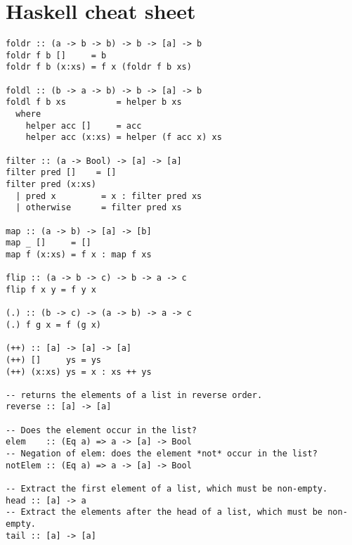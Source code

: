 \documentclass[paper=letter, fontsize=13pt]{article} %
\numberwithin{equation}{section} %
\begin{document}
\section{Haskell cheat sheet}
\begin{lstlisting}
foldr :: (a -> b -> b) -> b -> [a] -> b
foldr f b []     = b
foldr f b (x:xs) = f x (foldr f b xs)

foldl :: (b -> a -> b) -> b -> [a] -> b
foldl f b xs          = helper b xs
  where
    helper acc []     = acc
    helper acc (x:xs) = helper (f acc x) xs

filter :: (a -> Bool) -> [a] -> [a]
filter pred []    = []
filter pred (x:xs)
  | pred x         = x : filter pred xs
  | otherwise      = filter pred xs

map :: (a -> b) -> [a] -> [b]
map _ []     = []
map f (x:xs) = f x : map f xs

flip :: (a -> b -> c) -> b -> a -> c
flip f x y = f y x

(.) :: (b -> c) -> (a -> b) -> a -> c
(.) f g x = f (g x)

(++) :: [a] -> [a] -> [a]
(++) []     ys = ys
(++) (x:xs) ys = x : xs ++ ys

-- returns the elements of a list in reverse order.
reverse :: [a] -> [a]

-- Does the element occur in the list?
elem    :: (Eq a) => a -> [a] -> Bool
-- Negation of elem: does the element *not* occur in the list?
notElem :: (Eq a) => a -> [a] -> Bool

-- Extract the first element of a list, which must be non-empty.
head :: [a] -> a
-- Extract the elements after the head of a list, which must be non-empty.
tail :: [a] -> [a]
\end{lstlisting}
\end{document}
